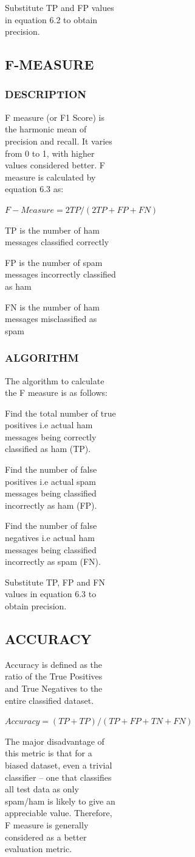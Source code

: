 \begin{figure}[h]
\begin{figure}[h]
\begin{figure}[h]
\begin{figure}[h]
Substitute TP and FP values in equation 6.2 to obtain precision.

\subsection{F-MEASURE}
\subsubsection{DESCRIPTION}
F measure (or F1 Score) is the harmonic mean of precision and recall. It varies from 0 to 1, with higher values considered better. F measure is calculated by equation 6.3 as:


$F-Measure=2TP/(2TP+FP+FN)$


TP is the number of ham messages classified correctly


FP is the number of spam messages incorrectly classified as ham


FN is the number of ham messages misclassified as spam


\subsubsection{ALGORITHM}
The algorithm to calculate the F measure is as follows:


Find the total number of true positives i.e actual ham messages being correctly 
classified as ham (TP).


Find the number of false positives i.e actual spam messages being classified incorrectly as ham (FP).


Find the number of false negatives i.e actual ham messages being classified incorrectly as spam (FN).


Substitute TP, FP and FN values in equation 6.3 to obtain precision.


\subsection{ACCURACY}
Accuracy is defined as the ratio of the True Positives and True Negatives to the entire classified dataset.


$Accuracy=(TP+TP)/(TP+FP+TN+FN)$


The major disadvantage of this metric is that for a biased dataset, even a trivial classifier – one that classifies all test data as only spam/ham is likely to give an appreciable value. Therefore, F measure is generally considered as a better evaluation metric.



\end{figure}
\end{figure}
\end{figure}
\end{figure}

